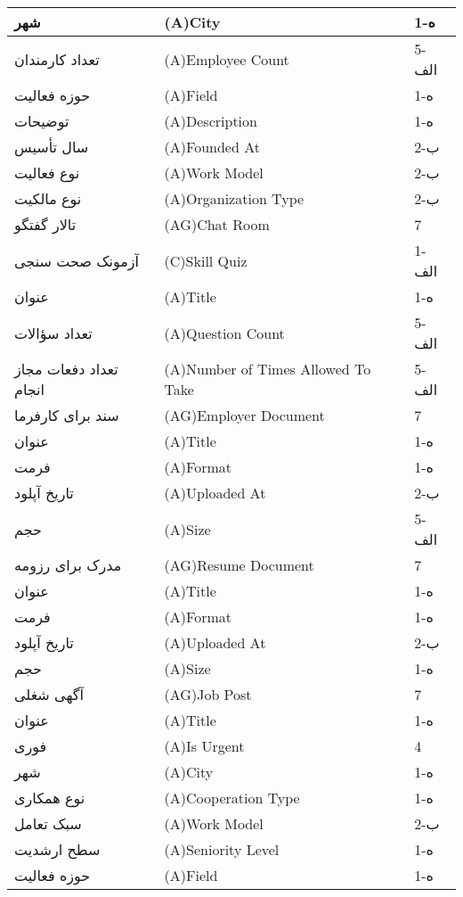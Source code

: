 \documentclass[12pt]{article}
\begin{document}
\begin{longtable}{|l|l|l|}
		\hline
		شهر & (A)City & 1-ه   \\
		\hline
		تعداد کارمندان & (A)Employee Count & 5-الف \\
		\hline
		حوزه فعالیت & (A)Field & 1-ه   \\
		\hline
		توضیحات & (A)Description & 1-ه   \\
		\hline
		سال تأسیس & (A)Founded At & 2-ب   \\
		\hline
		نوع فعالیت & (A)Work Model & 2-ب   \\
		\hline
		نوع مالکیت & (A)Organization Type & 2-ب   \\
		\hline
		تالار گفتگو & (AG)Chat Room & 7     \\
		\hline
		آزمونک صحت سنجی & (C)Skill Quiz & 1-الف \\
		\hline
		عنوان & (A)Title & 1-ه   \\
		\hline
		تعداد سؤالات & (A)Question Count & 5-الف \\
		\hline
		تعداد دفعات مجاز انجام & (A)Number of Times Allowed To Take & 5-الف \\
		\hline
		سند برای کارفرما & (AG)Employer Document & 7     \\
		\hline
		عنوان & (A)Title & 1-ه   \\
		\hline
		فرمت & (A)Format & 1-ه   \\
		\hline
		تاریخ آپلود & (A)Uploaded At & 2-ب   \\
		\hline
		حجم & (A)Size & 5-الف \\
		\hline
		مدرک برای رزومه & (AG)Resume Document & 7     \\
		\hline
		عنوان & (A)Title & 1-ه   \\
		\hline
		فرمت & (A)Format & 1-ه   \\
		\hline
		تاریخ آپلود & (A)Uploaded At & 2-ب   \\
		\hline
		حجم & (A)Size & 1-ه   \\
		\hline
		آگهی شغلی & (AG)Job Post & 7     \\
		\hline
		عنوان & (A)Title & 1-ه   \\
		\hline
		فوری & (A)Is Urgent & 4     \\
		\hline
		شهر & (A)City & 1-ه   \\
		\hline
		نوع همکاری & (A)Cooperation Type & 1-ه   \\
		\hline
		سبک تعامل & (A)Work Model & 2-ب   \\
		\hline
		سطح ارشدیت & (A)Seniority Level & 1-ه   \\
		\hline
		حوزه فعالیت & (A)Field & 1-ه   \\

\end{longtable}
\end{document}
